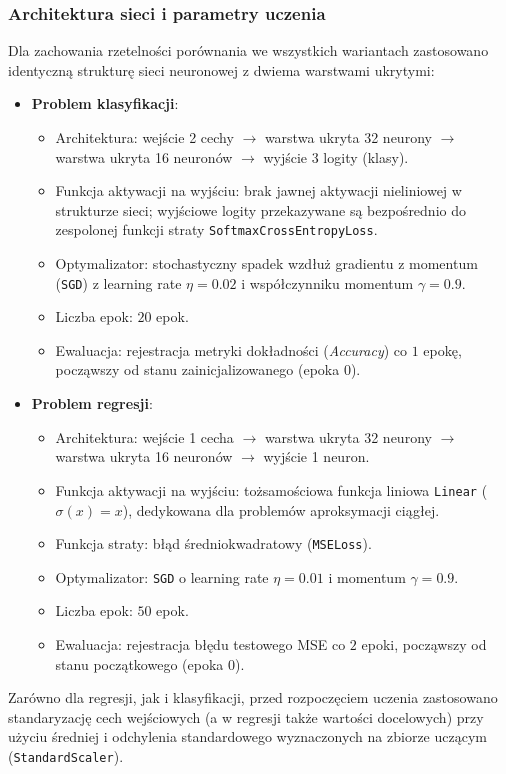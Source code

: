 \documentclass[11pt,a4paper]{article}
\begin{document}
\subsubsection{Architektura sieci i parametry uczenia}
Dla zachowania rzetelności porównania we wszystkich wariantach zastosowano identyczną strukturę sieci neuronowej z dwiema warstwami ukrytymi:
\begin{itemize}
    \item \textbf{Problem klasyfikacji}:
    \begin{itemize}
        \item Architektura: wejście 2 cechy $\to$ warstwa ukryta 32 neurony $\to$ warstwa ukryta 16 neuronów $\to$ wyjście 3 logity (klasy).
        \item Funkcja aktywacji na wyjściu: brak jawnej aktywacji nieliniowej w strukturze sieci; wyjściowe logity przekazywane są bezpośrednio do zespolonej funkcji straty \texttt{SoftmaxCrossEntropyLoss}.
        \item Optymalizator: stochastyczny spadek wzdłuż gradientu z momentum (\texttt{SGD}) z learning rate $\eta = 0.02$ i współczynniku momentum $\gamma = 0.9$.
        \item Liczba epok: $20$ epok.
        \item Ewaluacja: rejestracja metryki dokładności (\emph{Accuracy}) co $1$ epokę, począwszy od stanu zainicjalizowanego (epoka $0$).
    \end{itemize}
    \item \textbf{Problem regresji}:
    \begin{itemize}
        \item Architektura: wejście 1 cecha $\to$ warstwa ukryta 32 neurony $\to$ warstwa ukryta 16 neuronów $\to$ wyjście 1 neuron.
        \item Funkcja aktywacji na wyjściu: tożsamościowa funkcja liniowa \texttt{Linear} ($\sigma(x) = x$), dedykowana dla problemów aproksymacji ciągłej.
        \item Funkcja straty: błąd średniokwadratowy (\texttt{MSELoss}).
        \item Optymalizator: \texttt{SGD} o learning rate $\eta = 0.01$ i momentum $\gamma = 0.9$.
        \item Liczba epok: $50$ epok.
        \item Ewaluacja: rejestracja błędu testowego MSE co $2$ epoki, począwszy od stanu początkowego (epoka $0$).
    \end{itemize}
\end{itemize}
Zarówno dla regresji, jak i klasyfikacji, przed rozpoczęciem uczenia zastosowano standaryzację cech wejściowych (a w regresji także wartości docelowych) przy użyciu średniej i odchylenia standardowego wyznaczonych na zbiorze uczącym (\texttt{StandardScaler}).
\end{document}
